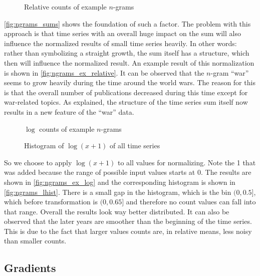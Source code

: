 \begin{figure}
    \centering
    
    \caption{Relative counts of example $n$-grams}\label{fig:ngrams_ex_relative}
\end{figure}

\autoref{fig:ngrams_sums} shows the foundation of such a factor. The problem with this approach is that time series with an overall huge impact on the sum will also influence the normalized results of small time series heavily. In other words: rather than symbolizing a straight growth, the sum itself has a structure, which then will influence the normalized result. An example result of this normalization is shown in \autoref{fig:ngrams_ex_relative}. It can be observed that the $n$-gram \enquote{war} seems to grow heavily during the time around the world wars. The reason for this is that the overall number of publications decreased during this time except for war-related topics. As explained, the structure of the time series sum itself now results in a new feature of the \enquote{war} data.

\begin{figure}
    \centering
    
    \caption{$\log$ counts of example $n$-grams}\label{fig:ngrams_ex_log}
\end{figure}

\begin{figure}
    \centering
    
    \caption{Histogram of $\log(x + 1)$ of all time series}\label{fig:ngrams_lhist}
\end{figure}

So we choose to apply $\log(x + 1)$ to all values for normalizing. Note the \num{1} that was added because the range of possible input values starts at \num{0}. The results are shown in \autoref{fig:ngrams_ex_log} and the corresponding histogram is shown in \autoref{fig:ngrams_lhist}. There is a small gap in the histogram, which is the bin $(0,0.5]$, which before transformation is $(0,0.65]$ and therefore no count values can fall into that range. Overall the results look way better distributed. It can also be observed that the later years are smoother than the beginning of the time series. This is due to the fact that larger values counts are, in relative means, less noisy than smaller counts.


\subsection{Gradients}
\label{ssec:baseline:sim:grad}

